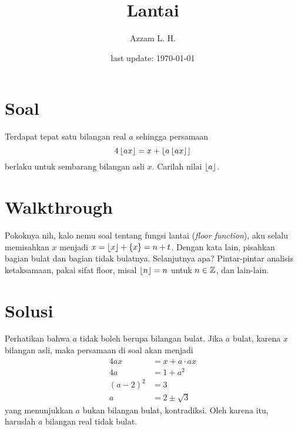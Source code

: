 \documentclass[12pt]{scrartcl}
\title{Lantai}
\author{Azzam L. H.}
\date{last update: \today}
\begin{document}
\maketitle
\pagestyle{plain}
\vspace{-1.5cm}
\section{Soal}
Terdapat tepat satu bilangan real $a$ sehingga persamaan
$$4\left\lfloor ax \right\rfloor = x + \left\lfloor a\left\lfloor ax \right\rfloor \right\rfloor$$
berlaku untuk sembarang bilangan asli $x$. Carilah nilai $\left\lfloor a \right\rfloor$.

\newpage
\section{Walkthrough}
Pokoknya nih, kalo nemu soal tentang fungsi lantai (\textit{floor function}), aku selalu memisahkan $x$ menjadi $x= \left\lfloor x \right\rfloor + \{x\} = n + t$. Dengan kata lain, pisahkan bagian bulat dan bagian tidak bulatnya. Selanjutnya apa? Pintar-pintar analisis ketaksamaan, pakai sifat floor, misal $\left\lfloor n \right\rfloor=n$ untuk $n \in \mathbb Z$, dan lain-lain.

\section{Solusi}
    Perhatikan bahwa $a$ tidak boleh berupa bilangan bulat. Jika $a$ bulat, karena $x$ bilangan asli, maka persamaan di soal akan menjadi
    \begin{align*}
        4ax &= x + a\cdot ax\\
        4a &= 1 + a^2\\
        (a-2)^2 &= 3\\
        a &= 2 \pm \sqrt{3} 
    \end{align*}
    yang menunjukkan $a$ bukan bilangan bulat, kontradiksi. Oleh karena itu, haruslah $a$ bilangan real tidak bulat.
    
\end{document}
